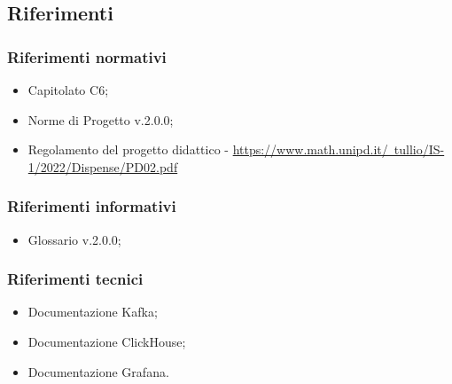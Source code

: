 \subsection{Riferimenti}
\subsubsection{Riferimenti normativi}
\begin{itemize}
    \item Capitolato C6;
    \item Norme di Progetto v.2.0.0;
    \item  Regolamento del progetto didattico - \href{https://www.math.unipd.it/~tullio/IS-1/2022/Dispense/PD02.pdf}{https://www.math.unipd.it/~tullio/IS-1/2022/Dispense/PD02.pdf}
\end{itemize}
\subsubsection{Riferimenti informativi}
\begin{itemize}
    \item Glossario v.2.0.0;
\end{itemize}
\subsubsection{Riferimenti tecnici}
\begin{itemize}
    \item Documentazione Kafka; 
    \item Documentazione ClickHouse; 
    \item Documentazione Grafana.
\end{itemize}
